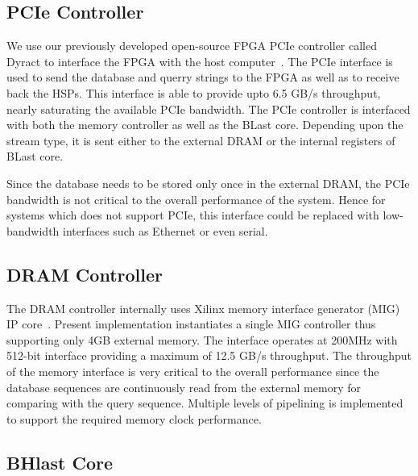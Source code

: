 \subsection{PCIe Controller}
We use our previously developed open-source FPGA PCIe controller called Dyract to interface the FPGA with the host computer~\cite{Vipin2014}.
The PCIe interface is used to send the database and querry strings to the FPGA as well as to receive back the HSPs.
This interface is able to provide upto 6.5 GB/s throughput, nearly saturating the available PCIe bandwidth.
The PCIe controller is interfaced with both the memory controller as well as the BLast core.
Depending upon the stream type, it is sent either to the external DRAM or the internal registers of BLast core.

Since the database needs to be stored only once in the external DRAM, the PCIe bandwidth is not critical to the overall performance of the system. Hence for systems which does not support PCIe, this interface could be replaced with low-bandwidth interfaces such as Ethernet or even serial.

\subsection{DRAM Controller}
The DRAM controller internally uses Xilinx memory interface generator (MIG) IP core~\cite{mig2018}. 
Present implementation instantiates a single MIG controller thus supporting only 4GB external memory.
The interface operates at 200MHz with 512-bit interface providing a maximum of 12.5 GB/s throughput.
The throughput of the memory interface is very critical to the overall performance since the database sequences are continuously read from the external memory for comparing with the query sequence.
Multiple levels of pipelining is implemented to support the required memory clock performance.

\subsection{BHlast Core}

